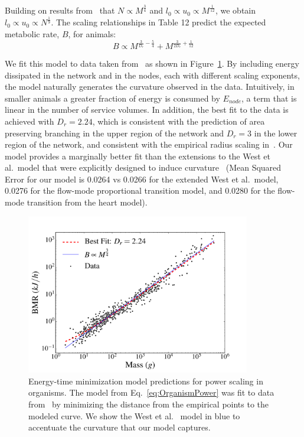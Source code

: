 \documentclass[12pt]{article}
\begin{document}
Building on results from~\cite{banavar10} that  $N \propto
M^{\frac{3}{4}}$ and $l_0 \propto u_0 \propto M^{\frac{1}{12}}$, we obtain $l_0 \propto u_0 \propto N^{\frac{1}{9}}$.
The scaling relationships in Table 12 predict the expected metabolic rate, $B$, for animals:
\begin{equation}
  \label{eq:OrganismPower}
  B \propto M^{\frac{3}{D_r} - \frac{5}{4}} + M^{\frac{3}{2D_r} + \frac{1}{12}}
\end{equation}

We fit this model to data taken from~\cite{kolokotrones2010curvature}
as shown 
in Figure~\ref{fig:OrganismsPowerScaling}. By including
energy dissipated in the network and in the nodes, each with different scaling exponents, the model naturally generates the
curvature observed in the data.  Intuitively, in smaller animals a greater fraction of energy is
consumed by $E_{node}$, a term that is linear in the number of service
volumes. In addition, the best fit to the data is achieved with $D_r = 2.24$,
which is consistent with the prediction of area preserving branching in the
upper region of the network and $D_r = 3$ in the lower region of the network, and consistent with the empirical radius scaling in~\cite{newberry2015testing}.
Our model provides a marginally better fit than
the extensions to the West et al.\ model that were explicitly designed to induce
curvature~\cite{kolokotrones2010curvature} (Mean Squared Error for our model is 0.0264 vs 0.0266 for the extended
West et al.\ model, 0.0276 for the flow-mode proportional transition model,
and 0.0280 for the flow-mode transition from the heart model). 
 
\begin{figure}[!h] \centering
  \includegraphics[height=70mm]{Figures/OrganismsPowerScaling.pdf}

  \caption{Energy-time minimization model predictions for power
    scaling in organisms. The model from Eq.~\ref{eq:OrganismPower}
    was fit to data from~\cite{kolokotrones2010curvature} by minimizing the distance
    from the empirical points to the modeled curve. We show the West et al.~\cite{west97} model in blue to
    accentuate the curvature that our model captures.
    }
\label{fig:OrganismsPowerScaling}
\end{figure}
\end{document}
